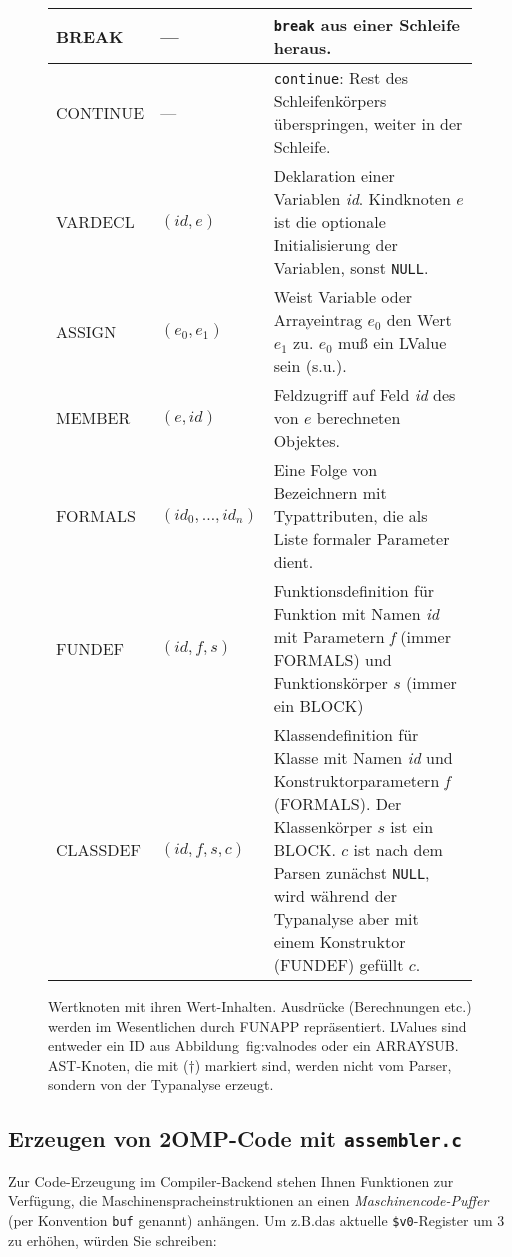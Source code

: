 \documentclass[11pt,a4paper]{article}
\newcommand{\Cpp}[1]{\textcolor{dcyan}{\texttt{#1}}}
\begin{document}
\begin{figure}[h]
\begin{tabular}{|p{2.5cm}|p{2cm}|p{12cm}|}
\hline
\textsf{BREAK}		& ---		& \texttt{break} aus einer Schleife heraus. \\
\hline
\textsf{CONTINUE} 	& ---		& \texttt{continue}: Rest des Schleifenkörpers überspringen, weiter in der Schleife. \\
\hline
\textsf{VARDECL}	& $(\textit{id}, e)$ & Deklaration einer Variablen \textit{id}.  Kindknoten $e$ ist die optionale Initialisierung der Variablen, sonst \Cpp{NULL}. \\
\hline
\textsf{ASSIGN}		& $(e_0, e_1)$  & Weist Variable oder Arrayeintrag  $e_0$ den Wert $e_1$ zu. $e_0$ muß ein LValue sein (s.u.). \\
\hline
\textsf{MEMBER}		& $(e, \textit{id}) $ & Feldzugriff auf Feld \textit{id} des von $e$ berechneten Objektes. \\ 
\hline
\textsf{FORMALS    }	&$(\textit{id}_0, \ldots, \textit{id}_n)$ & Eine Folge von Bezeichnern mit Typattributen, die als Liste formaler Parameter dient.\\
\hline
\textsf{FUNDEF     }	&$(\textit{id}, \textit{f}, s)$ & Funktionsdefinition für Funktion mit Namen \textit{id} mit Parametern \textit{f} (immer \textsf{FORMALS}) und Funktionskörper $s$ (immer ein \textsf{BLOCK})\\
\hline
\textsf{CLASSDEF   }	&$(\textit{id}, \textit{f}, s, c)$ & Klassendefinition für Klasse mit Namen \textit{id} und Konstruktorparametern \textit {f} (\textsf{FORMALS}).  Der Klassenkörper $s$ ist ein \textsf{BLOCK}.  $c$ ist nach dem Parsen zunächst \Cpp{NULL}, wird während der Typanalyse aber mit einem Konstruktor (\textsf{FUNDEF}) gefüllt $c$.\\
\hline
\end{tabular}
\caption{Wertknoten mit ihren Wert-Inhalten.  Ausdrücke (Berechnungen etc.) werden im Wesentlichen durch \textsf{FUNAPP} repräsentiert.  LValues sind
  entweder ein \textsf{ID} aus Abbildung~{fig:valnodes} oder ein \textsf{ARRAYSUB}.
  AST-Knoten, die mit ($\dagger$) markiert sind, werden nicht vom Parser, sondern von der Typanalyse erzeugt.
}\label{fig:rnodes}

\end{figure}

\subsection{Erzeugen von 2OMP-Code mit \texttt{assembler.c}}

Zur Code-Erzeugung im Compiler-Backend stehen Ihnen Funktionen zur Verfügung, die Maschinenspracheinstruktionen an einen
\emph{Maschinencode-Puffer} (per Konvention \texttt{buf} genannt) anhängen.  Um z.B.\@ das aktuelle \texttt{\$v0}-Register um $3$ zu erhöhen, würden
Sie schreiben:
\end{document}
